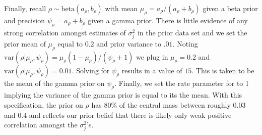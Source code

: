 \documentclass[ba]{imsart}
\newcommand{\mb}{\mathbf}
\begin{document}
Finally, recall $\rho\sim\text{beta}(a_\rho,b_\rho)$ with mean $\mu_\rho=a_\rho/(a_\rho+b_\rho)$ given a beta prior and precision
$\psi_\rho=a_\rho+b_\rho$ given a gamma prior. There is little evidence of any strong correlation amongst estimates of $\sigma^{2}_{j}$ in the prior data set and we set the prior mean of $\mu_{\rho}$ equal to $0.2$ and prior variance to $.01$. Noting $\text{var}(\rho|\mu_{\rho}, \psi_{\rho})=\mu_{\rho} (1-\mu_{p})/(\psi_{\rho}+1)$ we plug in $\mu_{\rho} = 0.2$ and $\text{var}(\rho|\mu_{\rho}, \psi_{\rho}) = 0.01$. Solving for $\psi_{\rho}$ results in a value of $15$. This is taken to be the mean of the gamma prior on $\psi_{\rho}$. Finally, we  set the rate parameter for to 1 implying the variance of the gamma prior is equal to its the mean. With this specification, the prior on $\rho$ has 80\% of the central mass between roughly $0.03$ and $0.4$ and reflects our prior belief that there is likely only weak positive correlation amongst the $\sigma^{2}_{j}$'s.



%
\end{document}
